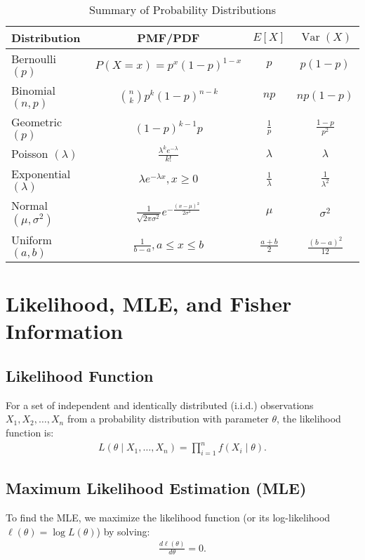 \documentclass[12pt]{article}
\begin{document}
\begin{table}[h]
    \centering
    \renewcommand{\arraystretch}{1.3}
    \begin{tabular}{@{}lccc@{}}
        \toprule
        Distribution & PMF/PDF & $E[X]$ & $\operatorname{Var}(X)$ \\
        \midrule
        Bernoulli $(p)$ & $P(X = x) = p^x(1-p)^{1-x}$ & $p$ & $p(1-p)$ \\
        Binomial $(n, p)$ & $\binom{n}{k} p^k (1-p)^{n-k}$ & $np$ & $np(1-p)$ \\
        Geometric $(p)$ & $(1-p)^{k-1} p$ & $\frac{1}{p}$ & $\frac{1-p}{p^2}$ \\
        Poisson $(\lambda)$ & $\frac{\lambda^k e^{-\lambda}}{k!}$ & $\lambda$ & $\lambda$ \\
        Exponential $(\lambda)$ & $\lambda e^{-\lambda x}, x \geq 0$ & $\frac{1}{\lambda}$ & $\frac{1}{\lambda^2}$ \\
        Normal $(\mu, \sigma^2)$ & $\frac{1}{\sqrt{2\pi\sigma^2}} e^{-\frac{(x-\mu)^2}{2\sigma^2}}$ & $\mu$ & $\sigma^2$ \\
        Uniform $(a, b)$ & $\frac{1}{b-a}, a \leq x \leq b$ & $\frac{a+b}{2}$ & $\frac{(b-a)^2}{12}$ \\
        \bottomrule
    \end{tabular}
    \caption{Summary of Probability Distributions}
    \label{tab:distributions}
\end{table}

\section{Likelihood, MLE, and Fisher Information}

\subsection{Likelihood Function}
For a set of independent and identically distributed (i.i.d.) observations $X_1, X_2, \dots, X_n$ from a probability distribution with parameter $\theta$, the likelihood function is:
\begin{align*}
    L(\theta \mid X_1, \dots, X_n) = \prod_{i=1}^{n} f(X_i \mid \theta).
\end{align*}

\subsection{Maximum Likelihood Estimation (MLE)}
To find the MLE, we maximize the likelihood function (or its log-likelihood $\ell(\theta) = \log L(\theta)$) by solving:
\begin{align*}
    \frac{d\ell(\theta)}{d\theta} = 0.
\end{align*}
\end{document}
